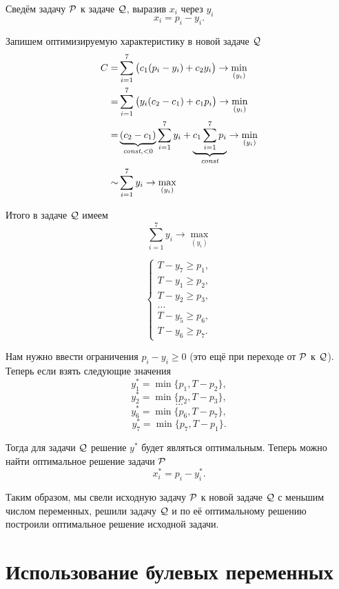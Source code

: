 Сведём задачу $\P$ к задаче $\Q$, выразив $x_i$ через $y_i$
\[
x_i = p_i - y_i.
\]

Запишем оптимизируемую характеристику в новой задаче $\Q$
\begin{align*}
	C =& \sum_{i=1}^7 \big(c_1 (p_i - y_i) + c_2 y_i\big) \to \min_{(y_i)} \\
	=&  \sum_{i=1}^7 \big(y_i (c_2 - c_1) + c_1 p_i\big) \to \min_{(y_i)} \\
	=& \underbrace{(c_2 - c_1)}_{\const, <0} \sum_{i=1}^7 y_i + \underbrace{c_1 \sum_{i=1}^{7} p_i}_{\const} \to \min_{(y_i)} \\
	\sim& \sum_{i=1}^7 y_i \to \max_{(y_i)}
\end{align*}

Итого в задаче $\Q$ имеем
\[
\sum_{i=1}^7 y_i \to \max_{(y_i)}
\]

\[
\begin{cases}
	T - y_7 \ge p_1, \\
	T - y_1 \ge p_2, \\
	T - y_2 \ge p_3, \\
	\dots \\
	T - y_5 \ge p_6, \\
	T - y_6 \ge p_7.
\end{cases}
\]

Нам нужно ввести ограничения $p_i - y_i \ge 0$ (это ещё при переходе от $\P$ к $\Q$). Теперь если взять следующие значения
\[
y_1^* = \min\{p_1, T - p_2\},
\]
\[
y_2^* = \min\{p_2, T - p_3\},
\]
\[
\dots
\]
\[
y_6^* = \min\{p_6, T - p_7\},
\]
\[
y_7^* = \min\{p_7, T - p_1\}.
\]

Тогда для задачи $\Q$ решение $y^*$ будет являться оптимальным. Теперь можно найти оптимальное решение задачи $\P$
\[
x_i^* = p_i - y_i^*.
\]

Таким образом, мы свели исходную задачу $\P$ к новой задаче $\Q$ с меньшим числом переменных, решили задачу $\Q$ и по её оптимальному решению построили оптимальное решение исходной задачи.

\section{Использование булевых переменных}


